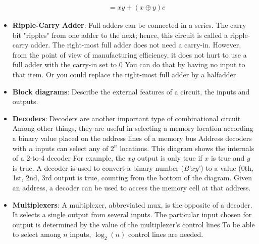 \documentclass{report}
\begin{document}
\begin{itemize}
\begin{align*}
                &=xy + (x \oplus y)c
            \end{align*}
        \item \textbf{Ripple-Carry Adder}: 
            Full adders can be connected in a series. The carry bit "ripples" from one adder to the next; hence, this circuit is called a ripple-carry adder.
            \bigbreak \noindent 
            \bigbreak \noindent 
            The right-most full adder does not need a carry-in. However, from the point of view of manufacturing efficiency, it does not hurt to use a full adder with the carry-in set to 0
            \bigbreak \noindent 
            You can do that by having no input to that item. Or you could replace the right-most full adder by a halfadder
        \item \textbf{Block diagrams}: Describe the external features of a circuit, the inputs and outputs.
        \item \textbf{Decoders}:
            Decoders are another important type of combinational circuit
            \bigbreak \noindent 
            Among other things, they are useful in selecting a memory location according a binary value placed on the address lines of a memory bus
            \bigbreak \noindent 
            Address decoders with $n$ inputs can select any of $2^{n}$ locations.
            \bigbreak \noindent 
            \bigbreak \noindent 
            This diagram shows the internals of a 2-to-4 decoder
            \bigbreak \noindent 
            \bigbreak \noindent 
            For example, the $xy$ output is only true if $x$ is true and $y$ is true.
            \bigbreak \noindent 
            A decoder is used to convert a binary number ($B’xy’$) to a value (0th, 1st, 2nd, 3rd output is true, counting from the bottom of the diagram.
            \bigbreak \noindent 
            Given an address, a decoder can be used to access the memory cell at that address.
        \item \textbf{Multiplexers}: A multiplexer, abbreviated mux, is the opposite of a decoder. It selects a single output from several inputs. The particular input chosen for output is determined by the value of the multiplexer’s control lines
            \bigbreak \noindent 
            To be able to select among $n$ inputs, $\log_{2}(n) $ control lines are needed.
            \bigbreak \noindent 

\end{itemize}
\end{document}
